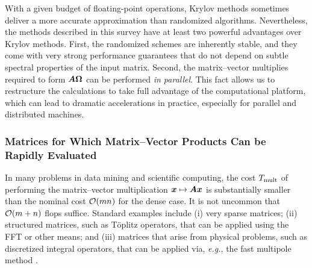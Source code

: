\documentclass[12pt]{article}
\begin{document}
With a given budget of floating-point operations, Krylov methods
sometimes deliver a more accurate approximation than randomized
algorithms.  Nevertheless, the methods described in this survey have at least
two powerful advantages over Krylov methods.  First, the randomized schemes
are inherently stable, and they come with very strong performance guarantees
that do not depend on %
subtle spectral properties of the input matrix.  Second, the matrix--vector multiplies
required to form $\bm{A\Omega}$ can be performed \emph{in parallel}.  This
fact allows us to restructure the calculations to take full advantage of the
computational platform, which can lead to dramatic accelerations in practice,
especially for parallel and distributed machines.



\subsubsection{Matrices for Which Matrix--Vector Products Can be Rapidly Evaluated}
\label{sec:fastmatvec}

In many problems in data mining and scientific computing, the cost
$T_{\rm mult}$ of performing the matrix--vector multiplication
$\bm{x} \mapsto \bm{A}\bm{x}$ is substantially smaller
than the nominal cost $\mathcal{O}(mn)$ for the dense case.
It is not uncommon that $\mathcal{O}(m + n)$ flops suffice.
Standard examples include (i) very sparse matrices;
(ii) structured matrices, such as T{\"o}plitz operators, that can be applied
using the FFT or other means; and
(iii) matrices that arise from physical problems, such as
discretized integral operators, that can be applied via, \textit{e.g.},
the fast multipole method \cite{rokhlin1997}.
\end{document}

